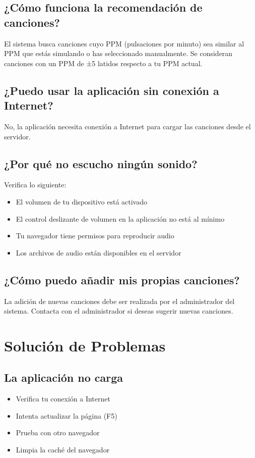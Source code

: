 \documentclass[a4paper,12pt]{article}
\begin{document}
\subsection{¿Cómo funciona la recomendación de canciones?}
El sistema busca canciones cuyo PPM (pulsaciones por minuto) sea similar al PPM que estás simulando o has seleccionado manualmente. Se consideran canciones con un PPM de ±5 latidos respecto a tu PPM actual.

\subsection{¿Puedo usar la aplicación sin conexión a Internet?}
No, la aplicación necesita conexión a Internet para cargar las canciones desde el servidor.

\subsection{¿Por qué no escucho ningún sonido?}
Verifica lo siguiente:
\begin{itemize}
    \item El volumen de tu dispositivo está activado
    \item El control deslizante de volumen en la aplicación no está al mínimo
    \item Tu navegador tiene permisos para reproducir audio
    \item Los archivos de audio están disponibles en el servidor
\end{itemize}

\subsection{¿Cómo puedo añadir mis propias canciones?}
La adición de nuevas canciones debe ser realizada por el administrador del sistema. Contacta con el administrador si deseas sugerir nuevas canciones.

\section{Solución de Problemas}

\subsection{La aplicación no carga}
\begin{itemize}
    \item Verifica tu conexión a Internet
    \item Intenta actualizar la página (F5)
    \item Prueba con otro navegador
    \item Limpia la caché del navegador
\end{itemize}
\end{document}
